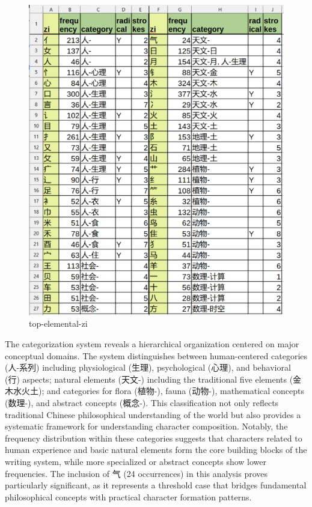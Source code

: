 \begin{figure}
\centering
\includegraphics{./images/top-elemental-zi-ENU.png}
\caption{top-elemental-zi}
\end{figure}

The categorization system reveals a hierarchical organization centered
on major conceptual domains. The system distinguishes between
human-centered categories (人-系列) including physiological (生理),
psychological (心理), and behavioral (行) aspects; natural elements
(天文-) including the traditional five elements (金木水火土); and
categories for flora (植物-), fauna (动物-), mathematical concepts
(数理-), and abstract concepts (概念-). This classification not only
reflects traditional Chinese philosophical understanding of the world
but also provides a systematic framework for understanding character
composition. Notably, the frequency distribution within these categories
suggests that characters related to human experience and basic natural
elements form the core building blocks of the writing system, while more
specialized or abstract concepts show lower frequencies. The inclusion
of 气 (24 occurrences) in this analysis proves particularly significant,
as it represents a threshold case that bridges fundamental philosophical
concepts with practical character formation patterns.


